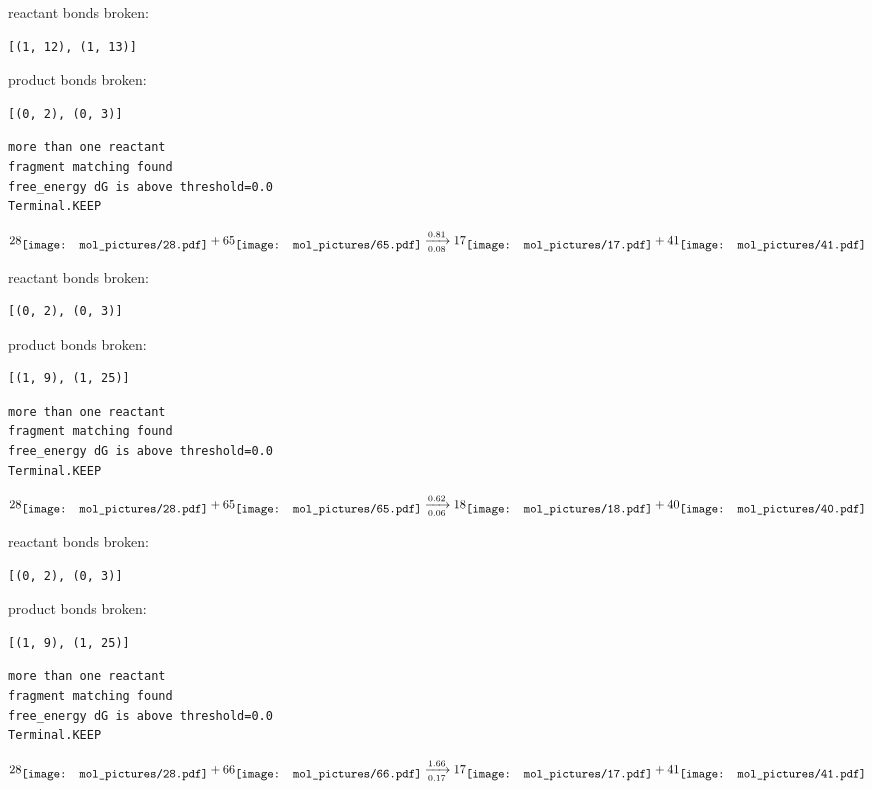 \documentclass{article}
\begin{document}
reactant bonds broken:\begin{verbatim}
[(1, 12), (1, 13)]
\end{verbatim}
product bonds broken:\begin{verbatim}
[(0, 2), (0, 3)]
\end{verbatim}




\vspace{1cm}
\begin{verbatim}
more than one reactant
fragment matching found
free_energy dG is above threshold=0.0
Terminal.KEEP
\end{verbatim}
$$
28
\raisebox{-.5\height}{\texttt{[image: mol\_pictures/28.pdf]}}
+
65
\raisebox{-.5\height}{\texttt{[image: mol\_pictures/65.pdf]}}
\xrightarrow[0.08]{0.81}
17
\raisebox{-.5\height}{\texttt{[image: mol\_pictures/17.pdf]}}
+
41
\raisebox{-.5\height}{\texttt{[image: mol\_pictures/41.pdf]}}
$$


reactant bonds broken:\begin{verbatim}
[(0, 2), (0, 3)]
\end{verbatim}
product bonds broken:\begin{verbatim}
[(1, 9), (1, 25)]
\end{verbatim}




\vspace{1cm}
\begin{verbatim}
more than one reactant
fragment matching found
free_energy dG is above threshold=0.0
Terminal.KEEP
\end{verbatim}
$$
28
\raisebox{-.5\height}{\texttt{[image: mol\_pictures/28.pdf]}}
+
65
\raisebox{-.5\height}{\texttt{[image: mol\_pictures/65.pdf]}}
\xrightarrow[0.06]{0.62}
18
\raisebox{-.5\height}{\texttt{[image: mol\_pictures/18.pdf]}}
+
40
\raisebox{-.5\height}{\texttt{[image: mol\_pictures/40.pdf]}}
$$


reactant bonds broken:\begin{verbatim}
[(0, 2), (0, 3)]
\end{verbatim}
product bonds broken:\begin{verbatim}
[(1, 9), (1, 25)]
\end{verbatim}




\vspace{1cm}
\begin{verbatim}
more than one reactant
fragment matching found
free_energy dG is above threshold=0.0
Terminal.KEEP
\end{verbatim}
$$
28
\raisebox{-.5\height}{\texttt{[image: mol\_pictures/28.pdf]}}
+
66
\raisebox{-.5\height}{\texttt{[image: mol\_pictures/66.pdf]}}
\xrightarrow[0.17]{1.66}
17
\raisebox{-.5\height}{\texttt{[image: mol\_pictures/17.pdf]}}
+
41
\raisebox{-.5\height}{\texttt{[image: mol\_pictures/41.pdf]}}
$$
\end{document}
